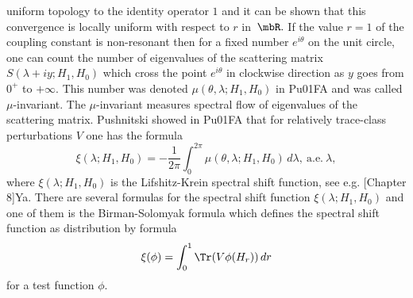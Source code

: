 \documentclass[11pt]{amsart}
\numberwithin{equation}{section}
\begin{document}
uniform topology to the identity operator $1$ and it can be shown that this convergence is
locally uniform with respect to $r$ in~$\mbR.$ 
If the value $r=1$ of the coupling constant is non-resonant then for a fixed number $e^{i\theta}$ on the unit circle, one can count the number of eigenvalues of the scattering matrix
$S(\lambda+iy; H_1,H_0)$ which cross the point $e^{i\theta}$ in clockwise direction as $y$ goes from $0^+$ to $+\infty.$
This number was denoted $\mu(\theta,\lambda; H_1,H_0)$ in {\futurelet\NChar\CleverCite}{Pu01FA} and was called $\mu$-invariant.
The $\mu$-invariant measures spectral flow of eigenvalues of the scattering matrix.
Pushnitski showed in {\futurelet\NChar\CleverCite}{Pu01FA} that for relatively trace-class perturbations $V$
one has the formula
$$
  \xi(\lambda; H_1,H_0) = - \frac {1}{2\pi} \int_0^{2\pi} \mu(\theta, \lambda; H_1,H_0)\,d\lambda, \ \text{a.e.}\ \lambda,
$$
where $\xi(\lambda; H_1,H_0)$ is the Lifshitz-Krein spectral shift function, see e.g. {\futurelet\NChar\CleverCite}[Chapter 8]{Ya}.
There are several formulas for the spectral shift function $\xi(\lambda; H_1,H_0)$ and one of them is the Birman-Solomyak formula
which defines the spectral shift function as distribution by formula
$$
  \xi(\phi) = \int_0^1 \Tr(V\phi(H_r))\,dr
$$
for a test function $\phi.$
\end{document}
